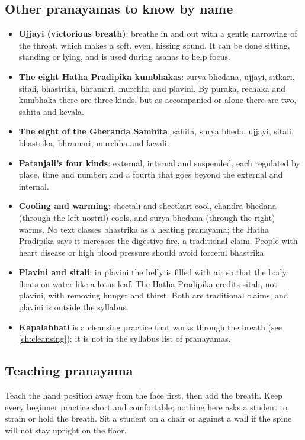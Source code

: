 \subsection*{Other pranayamas to know by name}
\begin{itemize}
\item \textbf{Ujjayi (victorious breath)}: breathe in and out with a gentle narrowing of the throat, which makes a soft, even, hissing sound. It can be done sitting, standing or lying, and is used during asanas to help focus.
\item \textbf{The eight Hatha Pradipika kumbhakas}: surya bhedana, ujjayi, sitkari, sitali, bhastrika, bhramari, murchha and plavini. By puraka, rechaka and kumbhaka there are three kinds, but as accompanied or alone there are two, sahita and kevala.
\item \textbf{The eight of the Gheranda Samhita}: sahita, surya bheda, ujjayi, sitali, bhastrika, bhramari, murchha and kevali.
\item \textbf{Patanjali's four kinds}: external, internal and suspended, each regulated by place, time and number; and a fourth that goes beyond the external and internal.
\item \textbf{Cooling and warming}: sheetali and sheetkari cool, chandra bhedana (through the left nostril) cools, and surya bhedana (through the right) warms. No text classes bhastrika as a heating pranayama; the Hatha Pradipika says it increases the digestive fire, a traditional claim. People with heart disease or high blood pressure should avoid forceful bhastrika.
\item \textbf{Plavini and sitali}: in plavini the belly is filled with air so that the body floats on water like a lotus leaf. The Hatha Pradipika credits sitali, not plavini, with removing hunger and thirst. Both are traditional claims, and plavini is outside the syllabus.
\item \textbf{Kapalabhati} is a cleansing practice that works through the breath (see \cref{ch:cleansing}); it is not in the syllabus list of pranayamas.
\end{itemize}

\subsection*{Teaching pranayama}
Teach the hand position away from the face first, then add the breath. Keep every beginner practice short and comfortable; nothing here asks a student to strain or hold the breath. Sit a student on a chair or against a wall if the spine will not stay upright on the floor.

